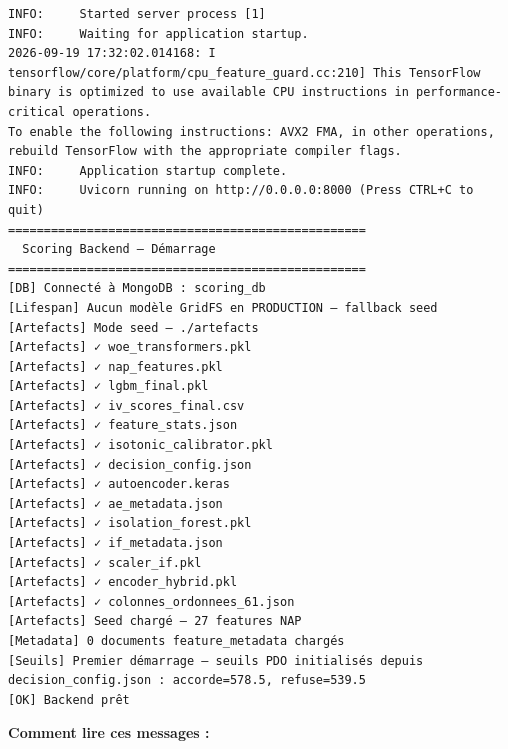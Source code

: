 \documentclass[
  french,
  11pt,
  a4paper,
]{article}
\begin{document}
\begin{Verbatim}[breaklines=true,breakanywhere=true,fontsize=\small,frame=leftline,framerule=1.6pt,rulecolor=\color{credixblue},framesep=3mm,xleftmargin=2mm,xrightmargin=1mm]
INFO:     Started server process [1]
INFO:     Waiting for application startup.
2026-09-19 17:32:02.014168: I tensorflow/core/platform/cpu_feature_guard.cc:210] This TensorFlow binary is optimized to use available CPU instructions in performance-critical operations.
To enable the following instructions: AVX2 FMA, in other operations, rebuild TensorFlow with the appropriate compiler flags.
INFO:     Application startup complete.
INFO:     Uvicorn running on http://0.0.0.0:8000 (Press CTRL+C to quit)
==================================================
  Scoring Backend — Démarrage
==================================================
[DB] Connecté à MongoDB : scoring_db
[Lifespan] Aucun modèle GridFS en PRODUCTION — fallback seed
[Artefacts] Mode seed — ./artefacts
[Artefacts] ✓ woe_transformers.pkl
[Artefacts] ✓ nap_features.pkl
[Artefacts] ✓ lgbm_final.pkl
[Artefacts] ✓ iv_scores_final.csv
[Artefacts] ✓ feature_stats.json
[Artefacts] ✓ isotonic_calibrator.pkl
[Artefacts] ✓ decision_config.json
[Artefacts] ✓ autoencoder.keras
[Artefacts] ✓ ae_metadata.json
[Artefacts] ✓ isolation_forest.pkl
[Artefacts] ✓ if_metadata.json
[Artefacts] ✓ scaler_if.pkl
[Artefacts] ✓ encoder_hybrid.pkl
[Artefacts] ✓ colonnes_ordonnees_61.json
[Artefacts] Seed chargé — 27 features NAP
[Metadata] 0 documents feature_metadata chargés
[Seuils] Premier démarrage — seuils PDO initialisés depuis decision_config.json : accorde=578.5, refuse=539.5
[OK] Backend prêt
\end{Verbatim}

\textbf{Comment lire ces messages :}
\end{document}
